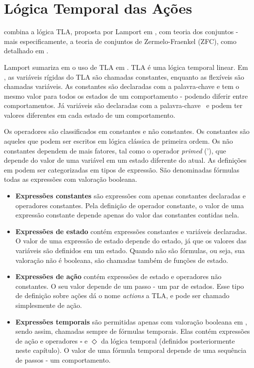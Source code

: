 \section{Lógica Temporal das Ações}
\label{sec:tla}

\TLA combina a lógica TLA, proposta por Lamport em \cite{tlaformalization}, com teoria dos conjuntos - mais especificamente, a teoria de conjuntos de Zermelo-Fraenkel (ZFC), como detalhado em \cite{merzlogic}.

Lamport sumariza em \cite{proofsystem} o uso de TLA em \TLAA. TLA é uma lógica temporal linear. Em \TLAA, as variáveis rígidas do TLA são chamadas constantes, enquanto as flexíveis são chamadas variáveis. As constantes são declaradas com a palavra-chave \CONSTANTS e tem o mesmo valor para todos os estados de um comportamento - podendo diferir entre comportamentos. Já variáveis são declaradas com a palavra-chave \VARIABLES\ e podem ter valores diferentes em cada estado de um comportamento.

Os operadores são classificados em constantes e não constantes. Os constantes são aqueles que podem ser escritos em lógica clássica de primeira ordem. Os não constantes dependem de mais fatores, tal como o operador \textit{primed} ('), que depende do valor de uma variável em um estado diferente do atual. As definições em \TLA podem ser categorizadas em tipos de expressão. São denominadas fórmulas todas as expressões com valoração booleana.
\begin{itemize}
  \item \textbf{Expressões constantes} são expressões com apenas constantes declaradas e o\-pe\-ra\-do\-res constantes. Pela definição de operador constante, o valor de uma expressão constante depende apenas do valor das constantes contidas nela.
  \item \textbf{Expressões de estado} contém expressões constantes e variáveis declaradas. O valor de uma expressão de estado depende do estado, já que os valores das variáveis são definidos em um estado. Quando não são fórmulas, ou seja, sua valoração não é booleana, são chamadas também de funções de estado.
  \item \textbf{Expressões de ação} contém expressões de estado e operadores não constantes. O seu valor depende de um passo - um par de estados. Esse tipo de definição sobre ações dá o nome \textit{actions} a TLA, e pode ser chamado simplesmente de ação.
  \item \textbf{Expressões temporais} são permitidas apenas com valoração booleana em \TLAA, sendo assim, chamadas sempre de fórmulas temporais. Elas contém expressões de ação e operadores $\square$ e $\Diamond$ da lógica temporal (definidos posteriormente neste capítulo). O valor de uma fórmula temporal depende de uma sequência de passos - um comportamento.
\end{itemize}

